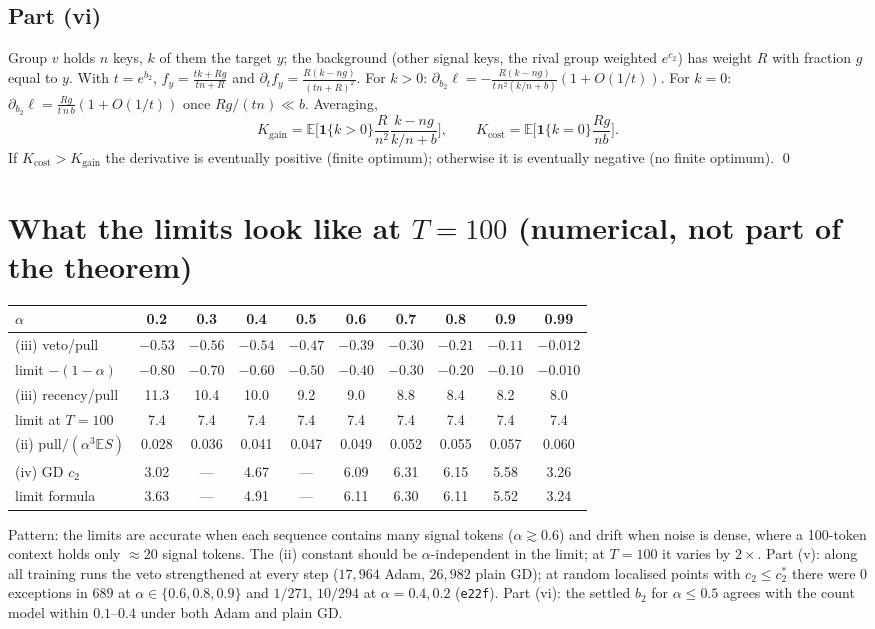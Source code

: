 \documentclass[11pt]{article}
\theoremstyle{definition}\newtheorem{assumption}{Assumption}\newtheorem{definition}{Definition}
\theoremstyle{remark}\newtheorem{remark}{Remark}
\newcommand{\1}{\mathbf{1}}\newcommand{\E}{\mathbb E}
\begin{document}
\subsection{Part (vi)}
Group $v$ holds $n$ keys, $k$ of them the target $y$; the background (other signal keys, the rival group
weighted $e^{c_2}$) has weight $R$ with fraction $g$ equal to $y$. With $t=e^{b_2}$, $f_y=\frac{tk+Rg}{tn+R}$ and
$\partial_tf_y=\frac{R(k-ng)}{(tn+R)^2}$. For $k>0$: $\partial_{b_2}\ell=-\frac{R(k-ng)}{t\,n^2(k/n+b)}(1+O(1/t))$. For
$k=0$: $\partial_{b_2}\ell=\frac{Rg}{t\,n\,b}(1+O(1/t))$ once $Rg/(tn)\ll b$. Averaging,
\[
K_{\mathrm{gain}}=\E\Big[\1\{k>0\}\frac{R}{n^2}\frac{k-ng}{k/n+b}\Big],\qquad K_{\mathrm{cost}}=\E\Big[\1\{k=0\}\frac{Rg}{nb}\Big].
\]
If $K_{\mathrm{cost}}>K_{\mathrm{gain}}$ the derivative is eventually positive (finite optimum); otherwise it is eventually
negative (no finite optimum). \qed

\section{What the limits look like at $T=100$ (numerical, not part of the theorem)}
\begin{center}\small
\begin{tabular}{lccccccccc}\toprule
$\alpha$ & 0.2 & 0.3 & 0.4 & 0.5 & 0.6 & 0.7 & 0.8 & 0.9 & 0.99\\\midrule
(iii) veto/pull & $-0.53$ & $-0.56$ & $-0.54$ & $-0.47$ & $-0.39$ & $-0.30$ & $-0.21$ & $-0.11$ & $-0.012$\\
\quad limit $-(1-\alpha)$ & $-0.80$ & $-0.70$ & $-0.60$ & $-0.50$ & $-0.40$ & $-0.30$ & $-0.20$ & $-0.10$ & $-0.010$\\
(iii) recency/pull & 11.3 & 10.4 & 10.0 & 9.2 & 9.0 & 8.8 & 8.4 & 8.2 & 8.0\\
\quad limit at $T=100$ & 7.4 & 7.4 & 7.4 & 7.4 & 7.4 & 7.4 & 7.4 & 7.4 & 7.4\\
(ii) pull$/(\alpha^3\E S)$ & 0.028 & 0.036 & 0.041 & 0.047 & 0.049 & 0.052 & 0.055 & 0.057 & 0.060\\
(iv) GD $c_2$ & 3.02 & --- & 4.67 & --- & 6.09 & 6.31 & 6.15 & 5.58 & 3.26\\
\quad limit formula & 3.63 & --- & 4.91 & --- & 6.11 & 6.30 & 6.11 & 5.52 & 3.24\\\bottomrule
\end{tabular}\end{center}
Pattern: the limits are accurate when each sequence contains many signal tokens ($\alpha\gtrsim0.6$) and
drift when noise is dense, where a 100-token context holds only $\approx20$ signal tokens. The (ii)
constant should be $\alpha$-independent in the limit; at $T=100$ it varies by $2\times$. Part (v):
along all training runs the veto strengthened at every step ($17{,}964$ Adam, $26{,}982$ plain GD); at
random localised points with $c_2\le c_2^\ast$ there were $0$ exceptions in $689$ at $\alpha\in\{0.6,0.8,0.9\}$
and $1/271$, $10/294$ at $\alpha=0.4, 0.2$ (\texttt{e22f}). Part (vi): the settled $b_2$ for $\alpha\le0.5$ agrees
with the count model within $0.1$--$0.4$ under both Adam and plain GD.
\end{document}
